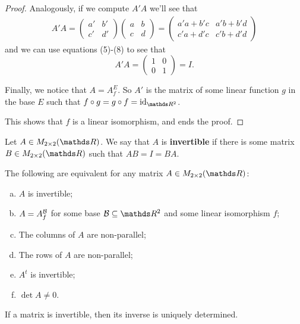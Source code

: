 \begin{proof}
	Analogously, if we compute $A'A$ we'll see that
	\begin{align*}
		A'A=\begin{pmatrix}
		a'&b'\\c'&d'
		\end{pmatrix}\begin{pmatrix}
		a&b\\c&d
		\end{pmatrix}=\begin{pmatrix}
		a'a+b'c&a'b+b'd\\
		c'a+d'c&c'b+d'd
		\end{pmatrix}
	\end{align*}and we can use equations (5)-(8) to see that 
	\[A'A=\begin{pmatrix}
	1&0\\0&1
	\end{pmatrix}=I.\]
	
	Finally, we notice that $A=A_f^{E}$. So $A'$ is the matrix of some linear function $g$ in the base $E$ such that $f\circ g=g\circ f=\id_{\R^2}$.
	
	This shows that $f$ is a linear isomorphism, and ends the proof.
\end{proof}

\vspace{5pt}
\begin{df}
	Let $A\in M_{2\times 2}(\R)$. We say that $A$ is \textbf{invertible} if there is some matrix $B\in M_{2\times 2}(\R)$ such that $AB=I=BA$.
\end{df}

\begin{cor}
	The following are equivalent for any matrix $A\in M_{2\times 2}(\R)$:
	\begin{enumerate}[a)]
		\item $A$ is invertible;
		\item $A=A_f^{\mathcal B}$ for some base $\mc B\subseteq \R^2$ and some linear isomorphism $f$;
		\item The columns of $A$ are non-parallel;
		\item The rows of $A$ are non-parallel;
		\item $A^t$ is invertible;
		\item $\det A\neq 0$.
	\end{enumerate}
\end{cor}
\begin{cor}
	If a matrix is invertible, then its inverse is uniquely determined.
\end{cor}